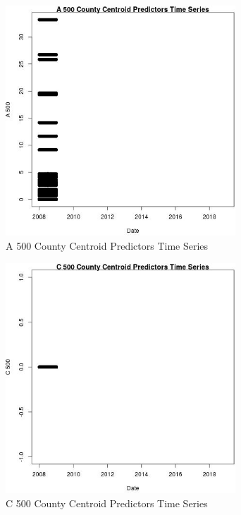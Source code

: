 \begin{figure} 
\centering  
\includegraphics[width=0.77\textwidth]{Code_Outputs/df_report_ML_predictors_CountyCentroid_Locations_Dates_2008-01-01to2018-12-31_A_500vDate.jpg} 
\caption{\label{fig:df_report_ML_predictors_CountyCentroid_Locations_Dates_2008-01-01to2018-12-31A_500vDate}A 500 County Centroid Predictors Time Series} 
\end{figure} 
 

\begin{figure} 
\centering  
\includegraphics[width=0.77\textwidth]{Code_Outputs/df_report_ML_predictors_CountyCentroid_Locations_Dates_2008-01-01to2018-12-31_C_500vDate.jpg} 
\caption{\label{fig:df_report_ML_predictors_CountyCentroid_Locations_Dates_2008-01-01to2018-12-31C_500vDate}C 500 County Centroid Predictors Time Series} 
\end{figure} 
 

